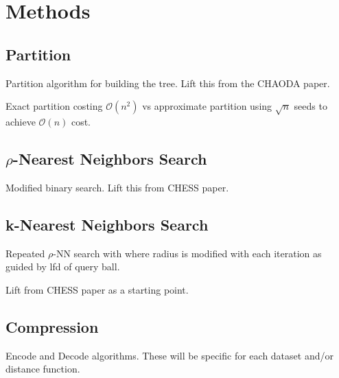 \section{Methods}
\label{sec:methods}

\subsection{Partition}
\label{subsec:methods:partition}

Partition algorithm for building the tree.
Lift this from the CHAODA paper.

Exact partition costing $\mathcal{O}(n^2)$ vs approximate partition using $\sqrt{n}$ seeds to achieve $\mathcal{O}(n)$ cost.

\subsection{\texorpdfstring{$\rho$}{p}-Nearest Neighbors Search}
\label{subsec:methods:rnn-search}

Modified binary search.
Lift this from CHESS paper.

\subsection{k-Nearest Neighbors Search}
\label{subsec:methods:knn-search}

Repeated $\rho$-NN search with where radius is modified with each iteration as guided by lfd of query ball.

Lift from CHESS paper as a starting point.

\subsection{Compression}
\label{subsec:methods:compression}

Encode and Decode algorithms.
These will be specific for each dataset and/or distance function.

